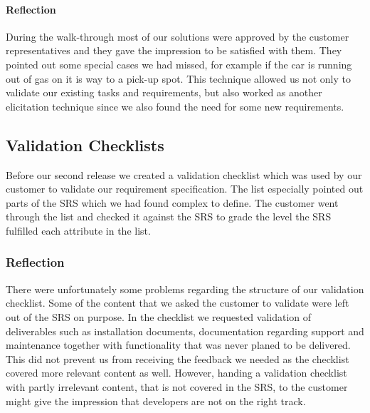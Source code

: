 \documentclass[10pt]{article}
\begin{document}
\paragraph{Reflection}
\hfill \break
During the walk-through most of our solutions were approved by the customer representatives and they gave the impression to be satisfied with them.
They pointed out some special cases we had missed, for example if the car is running out of gas on it is way to a pick-up spot.
This technique allowed us not only to validate our existing tasks and requirements, but also worked as another elicitation technique since we also found the need for some new requirements.

\subsection{Validation Checklists}
Before our second release we created a validation checklist which was used by our customer to validate our requirement specification. The list especially pointed out parts of the SRS which we had found complex to define. The customer went through the list and checked it against the SRS to grade the level the SRS fulfilled each attribute in the list.

\subsubsection{Reflection}
There were unfortunately some problems regarding the structure of our validation checklist. Some of the content that we asked the customer to validate were left out of the SRS on purpose. In the checklist we requested validation of deliverables such as installation documents, documentation regarding support and maintenance together with functionality that was never planed to be delivered.
This did not prevent us from receiving the feedback we needed as the checklist covered more relevant content as well. However, handing a validation checklist with partly irrelevant content, that is not covered in the SRS, to the customer might give the impression that developers are not on the right track. 
\end{document}
